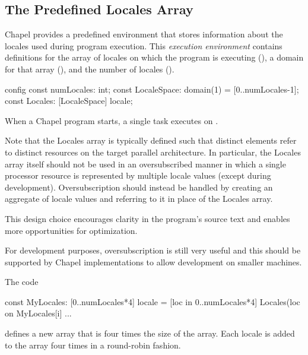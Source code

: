 \subsection{The Predefined Locales Array}
\label{Predefined_Locales_Array}

Chapel provides a predefined environment that stores information about
the locales used during program execution.  This {\em execution
environment} contains definitions for the array of locales on which
the program is executing (), a domain for that array
(), and the number of locales ().
\begin{chapel}
config const numLocales: int;
const LocaleSpace: domain(1) = [0..numLocales-1];
const Locales: [LocaleSpace] locale;
\end{chapel}
When a Chapel program starts, a single task executes 
on .

Note that the Locales array is typically defined such that distinct
elements refer to distinct resources on the target parallel
architecture.  In particular, the Locales array itself should not be
used in an oversubscribed manner in which a single processor resource
is represented by multiple locale values (except during development).
Oversubscription should instead be handled by creating an aggregate of
locale values and referring to it in place of the Locales array.

\begin{rationale}
This design choice encourages clarity in the program's source text and
enables more opportunities for optimization.

For development purposes, oversubscription is still very useful and
this should be supported by Chapel implementations to allow
development on smaller machines.
\end{rationale}

\begin{example}
The code
\begin{chapel}
const MyLocales: [0..numLocales*4] locale 
               = [loc in 0..numLocales*4] Locales(loc%
on MyLocales[i] ...
\end{chapel}
defines a new array  that is four times the size of
the  array.  Each locale is added to
the  array four times in a round-robin fashion.
\end{example}

